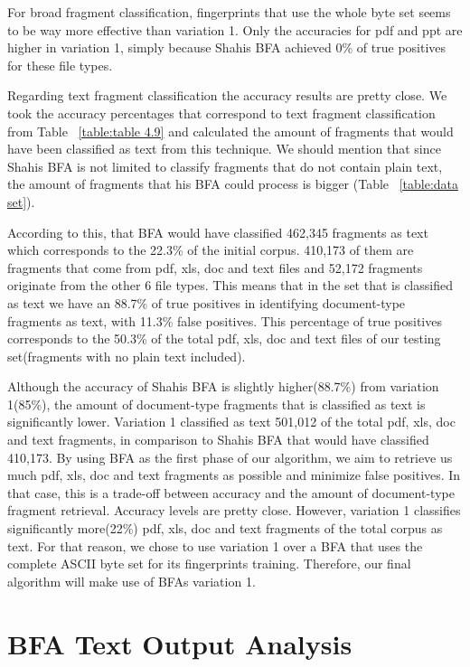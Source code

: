 
  
 For broad fragment classification, fingerprints that use the whole byte set seems to be way more effective than variation 1. Only the accuracies for pdf and ppt are higher in variation 1, simply because Shahis BFA achieved 0\% of true positives for these file types.
 
Regarding text fragment classification the accuracy results are pretty close. We took the accuracy percentages that correspond to text fragment classification from Table ~\ref{table:table 4.9} and calculated the amount of fragments that would have been classified as text from this technique. We should mention that since Shahis BFA is not limited to classify fragments that do not contain plain text, the amount of fragments that his BFA could process is bigger (Table ~\ref{table:data set}).

 According to this, that BFA would have classified 462,345 fragments as text which corresponds to the 22.3\% of the initial corpus. 410,173 of them are fragments that come from pdf, xls, doc and text files and 52,172 fragments originate from the other 6 file types. This means that in the set that is classified as text we have an 88.7\% of true positives in identifying document-type fragments as text, with 11.3\% false positives. This percentage of true positives corresponds to the 50.3\% of the total pdf, xls, doc and text files of our testing set(fragments with no plain text included).
 
Although the accuracy of Shahis BFA is slightly higher(88.7\%) from variation 1(85\%), the amount of document-type fragments that is classified as text is significantly lower. Variation 1 classified as text 501,012 of the total pdf, xls, doc and text fragments, in comparison to Shahis BFA that would have classified 410,173. By using BFA as the first phase of our algorithm, we aim to retrieve us much pdf, xls, doc and text fragments as possible and minimize false positives. In that case, this is a trade-off between accuracy and the amount of document-type fragment retrieval. Accuracy levels are pretty close. However, variation 1 classifies significantly more(22\%) pdf, xls, doc and text fragments of the total corpus as text. For that reason, we chose to use variation 1 over a BFA that uses the complete ASCII byte set for its fingerprints training. Therefore, our final algorithm will make use of BFAs variation 1.

\section{BFA Text Output Analysis} 

